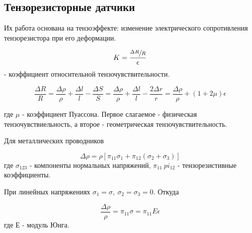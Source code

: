 \subsection{Тензорезисторные датчики}
Их работа основана на тензоэффекте: изменение электрического сопротивления тензорезистора при его деформации. 

\begin{equation}
	K = \frac{\sfrac{\Delta R}{R}}{\epsilon}
\end{equation}
- коэффициент относительной тензочувствительности.

\begin{equation}
	\frac{\Delta R}{R} = \frac{\Delta \rho}{\rho} + \frac{\Delta l}{l} - \frac{\Delta S}{S} = \frac{\Delta \rho}{\rho} + \frac{\Delta l}{l} - \frac{2\Delta r}{r} = \frac{\Delta \rho}{\rho} + (1 + 2\mu)\epsilon
\end{equation}

где $\mu$ - коэффициент Пуассона. Первое слагаемое - физическая тензочувствиельность, а второе - геометрическая тензочувствительность. 

Для металлических проводников 

\begin{equation}
	\Delta \rho = \rho [\pi_{11} \sigma_{1} + \pi_{12}(\sigma_{2} + \sigma_{3})]
\end{equation}
где $\sigma_{123}$ - компоненты нормальных напряжений, $\pi_{11} \ pi_{12}$ - тензорезистивные коэффициенты.

При линейных напряжениях $\sigma_{1} = \sigma, \ \sigma_{2} = \sigma_{3} = 0$.
Откуда

\begin{equation}
	\frac{\Delta \rho}{\rho} = \pi_{11} \sigma = \pi_{11}E\epsilon    
\end{equation}
где Е - модуль Юнга.

\newpage